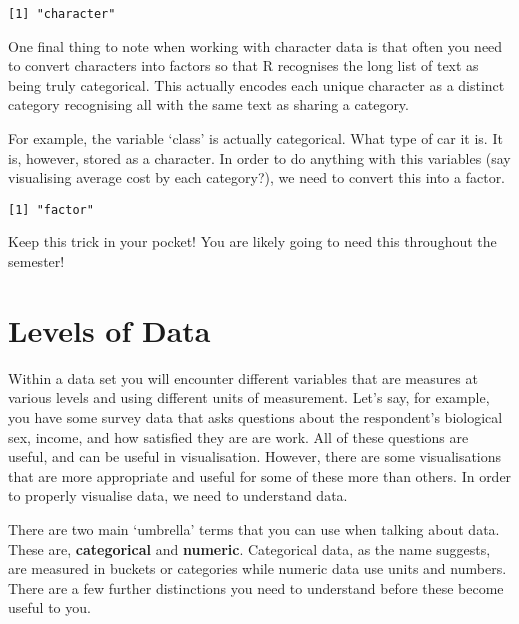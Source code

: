\documentclass[
  letterpaper,
  DIV=11,
  numbers=noendperiod]{scrreprt}
\newenvironment{Shaded}{\begin{snugshade}}{\end{snugshade}}
\newcommand{\FunctionTok}[1]{\textcolor[rgb]{0.28,0.35,0.67}{#1}}
\newcommand{\NormalTok}[1]{\textcolor[rgb]{0.00,0.23,0.31}{#1}}
\newcommand{\OtherTok}[1]{\textcolor[rgb]{0.00,0.23,0.31}{#1}}
\newcommand{\SpecialCharTok}[1]{\textcolor[rgb]{0.37,0.37,0.37}{#1}}
\begin{document}
\begin{verbatim}
[1] "character"
\end{verbatim}

One final thing to note when working with character data is that often
you need to convert characters into factors so that R recognises the
long list of text as being truly categorical. This actually encodes each
unique character as a distinct category recognising all with the same
text as sharing a category.

For example, the variable `class' is actually categorical. What type of
car it is. It is, however, stored as a character. In order to do
anything with this variables (say visualising average cost by each
category?), we need to convert this into a factor.

\begin{Shaded}
\end{Shaded}

\begin{verbatim}
[1] "factor"
\end{verbatim}

Keep this trick in your pocket! You are likely going to need this
throughout the semester!

\section{Levels of Data}\label{levels-of-data}

Within a data set you will encounter different variables that are
measures at various levels and using different units of measurement.
Let's say, for example, you have some survey data that asks questions
about the respondent's biological sex, income, and how satisfied they
are are work. All of these questions are useful, and can be useful in
visualisation. However, there are some visualisations that are more
appropriate and useful for some of these more than others. In order to
properly visualise data, we need to understand data.

There are two main `umbrella' terms that you can use when talking about
data. These are, \textbf{categorical} and \textbf{numeric}. Categorical
data, as the name suggests, are measured in buckets or categories while
numeric data use units and numbers. There are a few further distinctions
you need to understand before these become useful to you.
\end{document}
